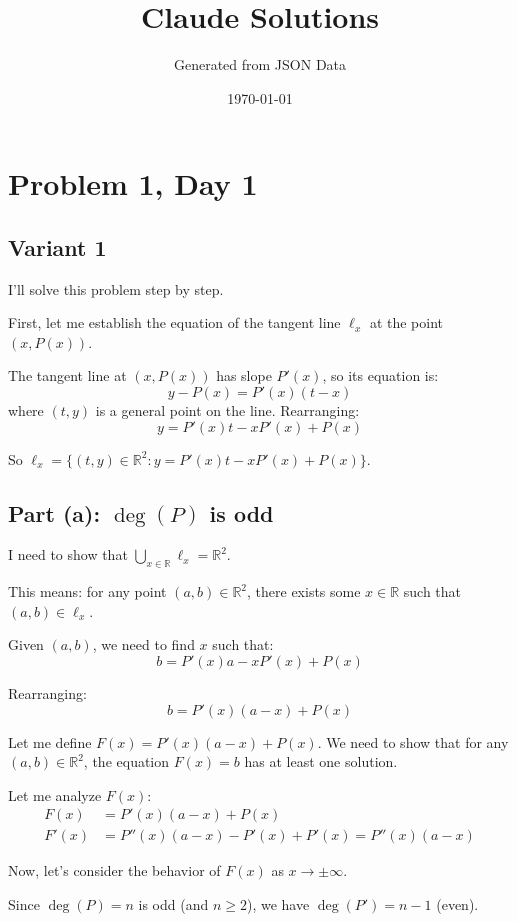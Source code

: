 \documentclass[12pt,a4paper]{article}
\title{Claude Solutions}
\author{Generated from JSON Data}
\date{\today}
\theoremstyle{definition}
\begin{document}
    \maketitle
    \tableofcontents
    \newpage
\section{Problem 1, Day 1}
\subsection{Variant 1}
    I'll solve this problem step by step.

    First, let me establish the equation of the tangent line $\ell_x$ at the point $(x, P(x))$.

    The tangent line at $(x, P(x))$ has slope $P'(x)$, so its equation is:
    $$y - P(x) = P'(x)(t - x)$$
    where $(t, y)$ is a general point on the line. Rearranging:
    $$y = P'(x)t - xP'(x) + P(x)$$

    So $\ell_x = \{(t, y) \in \mathbb{R}^2 : y = P'(x)t - xP'(x) + P(x)\}$.

    \subsection*{Part (a): $\deg(P)$ is odd}

    I need to show that $\bigcup_{x \in \mathbb{R}} \ell_x = \mathbb{R}^2$.

    This means: for any point $(a, b) \in \mathbb{R}^2$, there exists some $x \in \mathbb{R}$ such that $(a, b) \in \ell_x$.

    Given $(a, b)$, we need to find $x$ such that:
    $$b = P'(x)a - xP'(x) + P(x)$$

    Rearranging:
    $$b = P'(x)(a - x) + P(x)$$

    Let me define $F(x) = P'(x)(a - x) + P(x)$. We need to show that for any $(a, b) \in \mathbb{R}^2$, the equation $F(x) = b$ has at least one solution.

    Let me analyze $F(x)$:
    \begin{align}
        F(x) &= P'(x)(a - x) + P(x)\\
        F'(x) &= P''(x)(a - x) - P'(x) + P'(x) = P''(x)(a - x)
    \end{align}

    Now, let's consider the behavior of $F(x)$ as $x \to \pm\infty$.

    Since $\deg(P) = n$ is odd (and $n \geq 2$), we have $\deg(P') = n-1$ (even).
\end{document}
